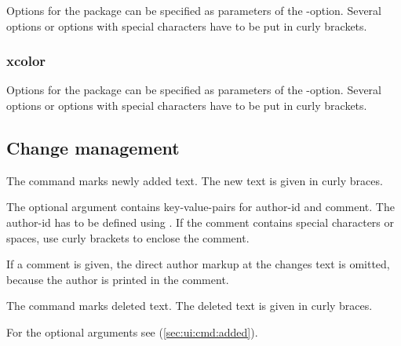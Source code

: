 
Options for the  package can be specified as parameters of the -option.
Several options or options with special characters have to be put in curly brackets.



\subsubsection{xcolor}


Options for the  package can be specified as parameters of the -option.
Several options or options with special characters have to be put in curly brackets.




\subsection{Change management}
\label{sec:ui:changemanagement}

\localtableofcontents



The command  marks newly added text.
The new text is given in curly braces.

The optional argument contains key-value-pairs for author-id and comment.
The author-id has to be defined using .
If the comment contains special characters or spaces, use curly brackets to enclose the comment.

If a comment is given, the direct author markup at the changes text is omitted, because the author is printed in the comment.





The command  marks deleted text.
The deleted text is given in curly braces.

For the optional arguments see  (\autoref{sec:ui:cmd:added}).

